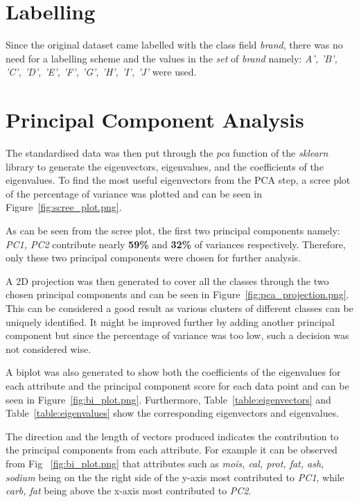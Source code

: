 \documentclass[preprint,12pt]{elsarticle}
\begin{document}
\section{Labelling}
\label{ss:Labelling}
Since the original dataset came labelled with the class field \textit{brand}, there was no need for a labelling scheme and the values in the \textit{set} of \textit{brand} namely:
\textit{A', 'B', 'C', 'D', 'E', 'F', 'G', 'H', 'I', 'J'} were used.

\section{Principal Component Analysis}
\label{ss:PrincipalComponentAnalysis}
The standardised data was then put through the \textit{pca} function of the \textit{sklearn} library \cite{pca2020} to generate the eigenvectors, eigenvalues, and the coefficients
of the eigenvalues. To find the most useful eigenvectors from the PCA step, a scree plot of the percentage of variance was plotted and can be seen in Figure~\ref{fig:scree_plot.png}.
\par
As can be seen from the scree plot, the first two principal components namely: \textit{PC1, PC2} contribute nearly \textbf{59\% }and \textbf{32\% }of variances respectively.
Therefore, only these two principal components were chosen for further analysis.
\par
A 2D projection was then generated to cover all the classes through the two chosen principal components and can be seen in Figure~\ref{fig:pca_projection.png}.
This can be considered a good result as various clusters of different classes can be uniquely identified. It might be improved further by adding another principal component
but since the percentage of variance was too low, such a decision was not considered wise.
\par
A biplot was also generated to show both the coefficients of the eigenvalues for each attribute and the principal component score for each data point and can be 
seen in Figure~\ref{fig:bi_plot.png}. Furthermore, Table~\ref{table:eigenvectors} and Table~\ref{table:eigenvalues} show the corresponding eigenvectors and eigenvalues.
\par
The direction and the length of vectors produced indicates the contribution to the principal components from each attribute. For example it can be observed from Fig ~\ref{fig:bi_plot.png} that attributes such as \textit{mois, cal, prot, fat, ash, sodium} being on the the right side of the y-axis most contributed to \textit{PC1}, while 
\textit{carb, fat} being above the x-axis most contributed to \textit{PC2}.
\end{document}
